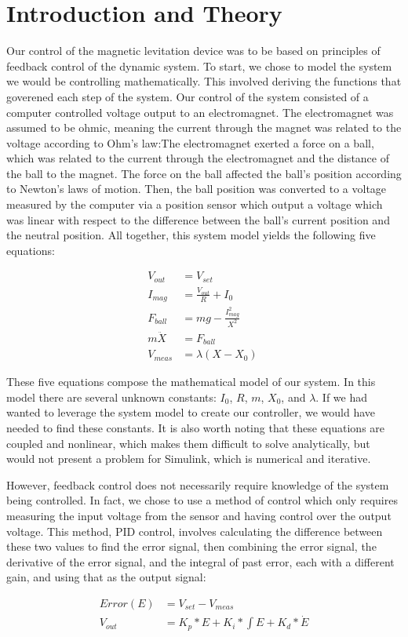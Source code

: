 \documentclass{article}
\begin{document}
\section{Introduction and Theory}
Our control of the magnetic levitation device was to be based on principles of feedback control of the dynamic system.  To start, we chose to model the system we would be controlling mathematically.  This involved deriving the functions that goverened each step of the system.  Our control of the system consisted of a computer controlled voltage output to an electromagnet.  The electromagnet was assumed to be ohmic, meaning the current through the magnet was related to the voltage according to Ohm's law:The electromagnet exerted a force on a ball, which was related to the current through the electromagnet and the distance of the ball to the magnet. The force on the ball affected the ball's position according to Newton's laws of motion.  Then, the ball position was converted to a voltage measured by the computer via a position sensor which output a voltage which was linear with respect to the difference between the ball's current position and the neutral position.  All together, this system model yields the following five equations: 
\begin{center}
\begin{align}
V_{out} &= V_{set}\\
I_{mag} &= \frac{V_{out}}{R} + I_0\\
F_{ball} &= mg - \frac{I_{mag}^2}{X^2}\\
m\ddot{X} &= F_{ball}\\
V_{meas} &= \lambda(X - X_0)\
\end{align}
\end{center}

These five equations compose the mathematical model of our system.  In this model there are several unknown constants: $I_0$, $R$, $m$, $X_0$, and $\lambda$.  If we had wanted to leverage the system model to create our controller, we would have needed to find these constants.   It is also worth noting that these equations are coupled and nonlinear, which makes them difficult to solve analytically, but would not present a problem for Simulink, which is numerical and iterative.

However, feedback control does not necessarily require knowledge of the system being controlled.  In fact, we chose to use a method of control which only requires measuring the input voltage from the sensor and having control over the output voltage.  This method, PID control, involves calculating the difference between these two values to find the error signal, then combining the error signal, the derivative of the error signal, and the integral of past error, each with a different gain, and using that as the output signal:
\begin{center}
\begin{align}
Error(E) &= V_{set} - V_{meas}\\
V_{out} &= K_p * E + K_i * \int{E} + K_d * \dot{E}
\end{align}
\end{center}
\end{document}
